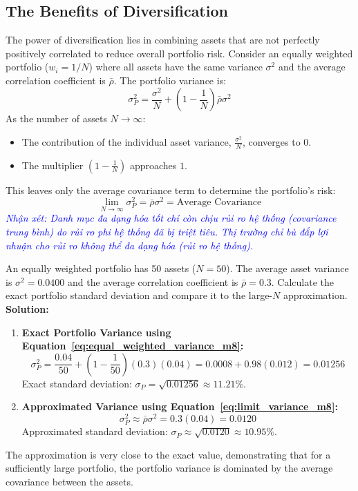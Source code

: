 \subsection{The Benefits of Diversification}
\label{subsec:The Benefits of Diversification}
The power of diversification lies in combining assets that are not perfectly positively correlated to reduce overall portfolio risk. 
Consider an equally weighted portfolio ($w_i = 1/N$) where all assets have the same variance $\sigma^2$ and the average correlation coefficient is $\bar{\rho}$. The portfolio variance is:
\begin{equation}
	\sigma_P^2 = \frac{\sigma^2}{N} + \left(1 - \frac{1}{N}\right) \bar{\rho} \sigma^2
	\label{eq:equal_weighted_variance_m8}
\end{equation}
As the number of assets $N \to \infty$:
\begin{itemize}
	\item The contribution of the individual asset variance, $\frac{\sigma^2}{N}$, converges to $0$.
	\item The multiplier $\left(1 - \frac{1}{N}\right)$ approaches $1$.
\end{itemize}
This leaves only the average covariance term to determine the portfolio's risk:
\begin{equation}
	\lim_{N \to \infty} \sigma_P^2 = \bar{\rho} \sigma^2 = \text{Average Covariance}
	\label{eq:limit_variance_m8}
\end{equation}
\textcolor{blue}{\textit{Nhận xét: Danh mục đa dạng hóa tốt chỉ còn chịu rủi ro hệ thống (covariance trung bình) do rủi ro phi hệ thống đã bị triệt tiêu. Thị trường chỉ bù đắp lợi nhuận cho rủi ro không thể đa dạng hóa (rủi ro hệ thống).}}
\begin{tcolorbox}[
	colback=gray!5!white,
	colframe=black!15!white,
	boxrule=0.5pt,
	arc=3pt,
	title=\textbf{Example 8: Approximating Standard Deviation of a Portfolio with Many Assets},
	coltitle=black,
	colbacktitle=black!5!white,
	before skip=6pt,
	after skip=6pt,
	breakable
]
An equally weighted portfolio has 50 assets ($N=50$). The average asset variance is $\sigma^2 = 0.0400$ and the average correlation coefficient is $\bar{\rho} = 0.3$.
Calculate the exact portfolio standard deviation and compare it to the large-$N$ approximation.
\textbf{Solution:}
\begin{enumerate}
	\item \textbf{Exact Portfolio Variance using Equation~\ref{eq:equal_weighted_variance_m8}:}
	      \[
	      \sigma_P^2 = \frac{0.04}{50} + \left(1 - \frac{1}{50}\right)(0.3)(0.04) = 0.0008 + 0.98(0.012) = 0.01256
	      \]
	      Exact standard deviation: $\sigma_P = \sqrt{0.01256} \approx 11.21\%$.
	\item \textbf{Approximated Variance using Equation~\ref{eq:limit_variance_m8}:}
	      \[
	      \sigma_P^2 \approx \bar{\rho} \sigma^2 = 0.3(0.04) = 0.0120
	      \]
	      Approximated standard deviation: $\sigma_P \approx \sqrt{0.0120} \approx 10.95\%$.
\end{enumerate}
The approximation is very close to the exact value, demonstrating that for a sufficiently large portfolio, the portfolio variance is dominated by the average covariance between the assets.
\end{tcolorbox}
